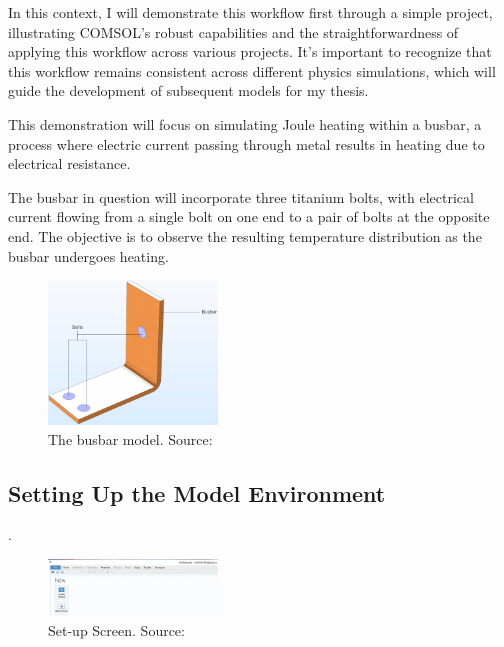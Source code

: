 In this context, I will demonstrate this workflow first through a simple project, illustrating COMSOL's robust capabilities and the straightforwardness of applying this workflow across various projects. It's important to recognize that this workflow remains consistent across different physics simulations, which will guide the development of subsequent models for my thesis.

This demonstration will focus on simulating Joule heating within a busbar, a process where electric current passing through metal results in heating due to electrical resistance.

The busbar in question will incorporate three titanium bolts, with electrical current flowing from a single bolt on one end to a pair of bolts at the opposite end. The objective is to observe the resulting temperature distribution as the busbar undergoes heating.

\begin{figure}[ht!]
  \centering
  \includegraphics[width=0.4\textwidth]{Chapters/Figures/Chapter 3 Figures/Busbar.png}
  \caption{The busbar model. Source: \cite{multiphysics__modeling_nodate}}
  \label{fig:The busbar model}
\end{figure}


\subsection{Setting Up the Model Environment}.
\begin{figure}[ht!]
  \centering
  \includegraphics[width=0.4\textwidth]{Chapters/Figures/Chapter 3 Figures/Set-up Screen.png}
  \caption{Set-up Screen. Source: \cite{multiphysics__modeling_nodate}}
  \label{fig:Set-up Screen}
\end{figure}

